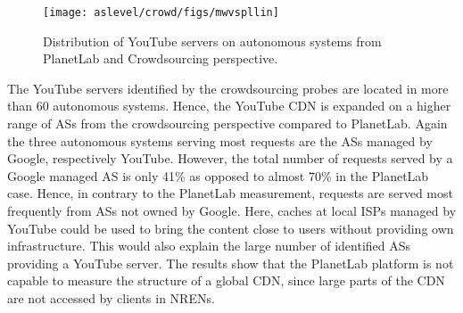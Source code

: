 \begin{figure}[tb]
	\centering
 	\texttt{[image: aslevel/crowd/figs/mwvspllin]}
  	\caption{Distribution of YouTube servers on autonomous systems from PlanetLab and Crowdsourcing perspective.}
  	\label{fig:AS_dst}
\end{figure}


The YouTube servers identified by the crowdsourcing probes are located in more than 60 autonomous systems.
Hence, the YouTube CDN is expanded on a higher range of ASs from the crowdsourcing perspective compared to PlanetLab.
Again the three autonomous systems serving most requests are the ASs managed by Google, respectively YouTube.
However, the total number of requests served by a Google managed AS is only 41\% as opposed to almost 70\% in the PlanetLab case.
Hence, in contrary to the PlanetLab measurement, requests are served most frequently from ASs not owned by Google.
Here, caches at local ISPs  managed by YouTube could be used to bring the content close to users without providing own infrastructure.
This would also explain the large number of identified ASs providing a YouTube server.
The results show that the PlanetLab platform is not capable to measure the structure of a global CDN, since large parts of the CDN are not accessed by clients in NRENs.




